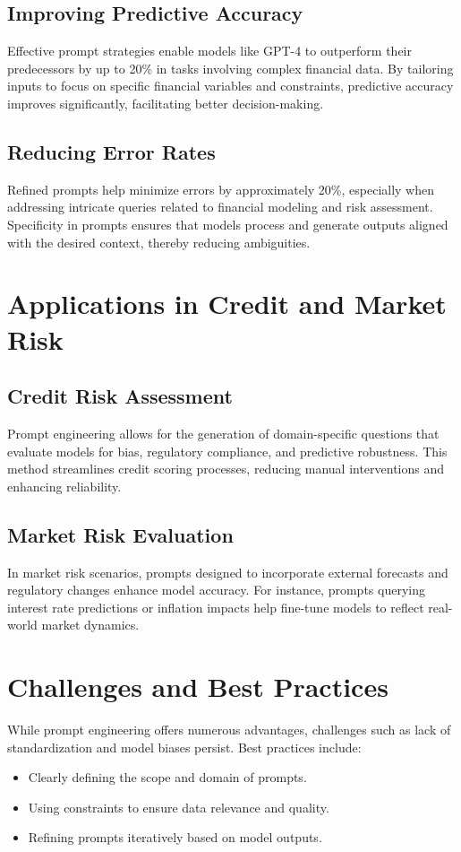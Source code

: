 \documentclass[a4paper,headinclude=on,footinclude=on,12pt,oneside]{scrbook}
\begin{document}
\subsection{Improving Predictive Accuracy}
Effective prompt strategies enable models like GPT-4 to outperform their predecessors by up to 20\% in tasks involving complex financial data. By tailoring inputs to focus on specific financial variables and constraints, predictive accuracy improves significantly, facilitating better decision-making.

\subsection{Reducing Error Rates}
Refined prompts help minimize errors by approximately 20\%, especially when addressing intricate queries related to financial modeling and risk assessment. Specificity in prompts ensures that models process and generate outputs aligned with the desired context, thereby reducing ambiguities.

\section{Applications in Credit and Market Risk}

\subsection{Credit Risk Assessment}
Prompt engineering allows for the generation of domain-specific questions that evaluate models for bias, regulatory compliance, and predictive robustness. This method streamlines credit scoring processes, reducing manual interventions and enhancing reliability.

\subsection{Market Risk Evaluation}
In market risk scenarios, prompts designed to incorporate external forecasts and regulatory changes enhance model accuracy. For instance, prompts querying interest rate predictions or inflation impacts help fine-tune models to reflect real-world market dynamics.

\section{Challenges and Best Practices}
While prompt engineering offers numerous advantages, challenges such as lack of standardization and model biases persist. Best practices include:
\begin{itemize}
	\item Clearly defining the scope and domain of prompts.
	\item Using constraints to ensure data relevance and quality.
	\item Refining prompts iteratively based on model outputs.
\end{itemize}
\end{document}
